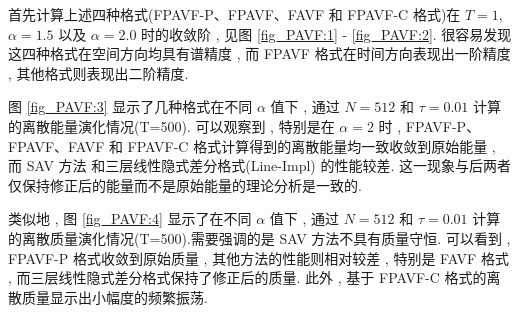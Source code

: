 首先计算上述四种格式(FPAVF-P、FPAVF、FAVF 和 FPAVF-C 格式)在 $T=1$, $\alpha=1.5$ 以及 $\alpha=2.0$  时的收敛阶 , 见图 \ref{fig_PAVF:1} - \ref{fig_PAVF:2}.
很容易发现这四种格式在空间方向均具有谱精度 , 而 FPAVF 格式在时间方向表现出一阶精度 , 其他格式则表现出二阶精度.

图 \ref{fig_PAVF:3} 显示了几种格式在不同 $\alpha$ 值下 , 通过 $N=512$ 和 $\tau=0.01$ 计算的离散能量演化情况(T=500).
可以观察到 , 特别是在 $\alpha=2$ 时 , FPAVF-P、FPAVF、FAVF 和 FPAVF-C 格式计算得到的离散能量均一致收敛到原始能量 , 
而 SAV 方法 \cite{chengConvergenceEnergyconservingScheme2022} 和三层线性隐式差分格式(Line-Impl) \cite{ranLinearlyImplicitConservative2016} 的性能较差.
这一现象与后两者仅保持修正后的能量而不是原始能量的理论分析是一致的.

	类似地 , 图 \ref{fig_PAVF:4} 显示了在不同 $\alpha$ 值下 , 通过 $N=512$ 和 $\tau=0.01$ 计算的离散质量演化情况(T=500).需要强调的是 SAV 方法不具有质量守恒.
可以看到 , FPAVF-P 格式收敛到原始质量 , 其他方法的性能则相对较差 , 特别是 FAVF 格式 , 而三层线性隐式差分格式保持了修正后的质量.
此外 , 基于 FPAVF-C 格式的离散质量显示出小幅度的频繁振荡.


